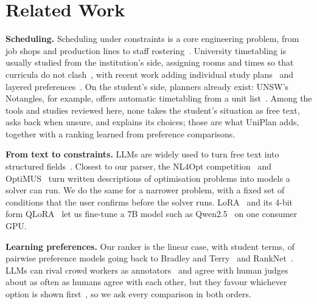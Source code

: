 \section{Related Work}\label{sec:related}

\textbf{Scheduling.} Scheduling under constraints is a core engineering problem, from job shops and production lines to staff rostering~\cite{pinedo2022}. University timetabling is usually studied from the institution's side, assigning rooms and times so that curricula do not clash~\cite{alghamdi2020}, with recent work adding individual study plans~\cite{steiner2025} and layered preferences~\cite{dunke2023}. On the student's side, planners already exist: UNSW's Notangles, for example, offers automatic timetabling from a unit list~\cite{notangles}. Among the tools and studies reviewed here, none takes the student's situation as free text, asks back when unsure, and explains its choices; those are what UniPlan adds, together with a ranking learned from preference comparisons.

\textbf{From text to constraints.} LLMs are widely used to turn free text into structured fields~\cite{xu2024ie}. Closest to our parser, the NL4Opt competition~\cite{ramamonjison2023nl4opt} and OptiMUS~\cite{ahmaditeshnizi2024optimus} turn written descriptions of optimisation problems into models a solver can run. We do the same for a narrower problem, with a fixed set of conditions that the user confirms before the solver runs. LoRA~\cite{hu2022lora} and its 4-bit form QLoRA~\cite{dettmers2023qlora} let us fine-tune a 7B model such as Qwen2.5~\cite{qwen2025} on one consumer GPU.

\textbf{Learning preferences.} Our ranker is the linear case, with student terms, of pairwise preference models going back to Bradley and Terry~\cite{bradley1952} and RankNet~\cite{burges2005ranknet}. LLMs can rival crowd workers as annotators~\cite{gilardi2023} and agree with human judges about as often as humans agree with each other, but they favour whichever option is shown first~\cite{zheng2023judge}, so we ask every comparison in both orders.
